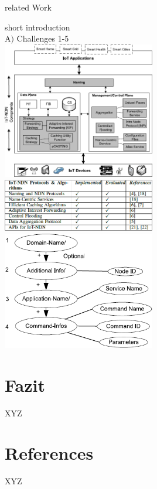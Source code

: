 \documentclass[a4paper,12pt]{article}
\begin{document}
related Work

short introduction\\

A$)$ Challenges 1-5\\





\includegraphics[width=0.5\textwidth]{IoT-NDN_System_architecture_and_its_components.png}\\
\includegraphics[width=0.5\textwidth]{IMPLEMENTED_AND_TESTED_PROTOCOLS_AND_ALGORITHMS_IN_IOT-NDN.png}\\
\includegraphics[width=0.5\textwidth]{Name_Structure_of_the_suggested_Approach.png}\\
\section{Fazit}
XYZ
\section{References}
XYZ
\end{document}
